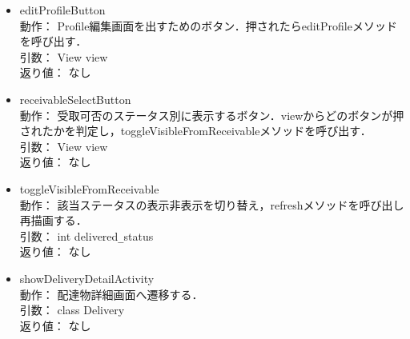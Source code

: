 \documentclass[a4j,titlepage]{jarticle}
\begin{document}
\begin{itemize}
  \item editProfileButton\\
  動作：  Profile編集画面を出すためのボタン．押されたらeditProfileメソッドを呼び出す．\\
  引数：  View view\\
  返り値：  なし

  \item receivableSelectButton\\
  動作：  受取可否のステータス別に表示するボタン．viewからどのボタンが押されたかを判定し，toggleVisibleFromReceivableメソッドを呼び出す．\\
  引数：  View view\\
  返り値：  なし

  \item toggleVisibleFromReceivable\\
  動作：  該当ステータスの表示非表示を切り替え，refreshメソッドを呼び出し再描画する．\\
  引数：  int delivered\verb|_|status\\
  返り値：  なし

  \item showDeliveryDetailActivity\\
  動作：  配達物詳細画面へ遷移する．\\
  引数：  class Delivery\\
  返り値：  なし
\end{itemize}
\end{document}
